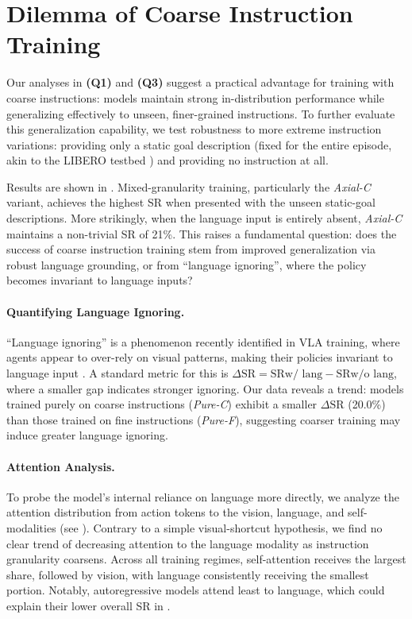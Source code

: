 \documentclass{article}
\begin{document}
\section{Dilemma of Coarse Instruction Training}
\label{sec:more_analysis_on_coarse_instruction_training}

Our analyses in \textbf{(Q1)} and \textbf{(Q3)} suggest a practical advantage for training with coarse instructions: models maintain strong in-distribution performance while generalizing effectively to unseen, finer-grained instructions. To further evaluate this generalization capability, we test robustness to more extreme instruction variations: providing only a static goal description (fixed for the entire episode, akin to the \textsc{LIBERO} testbed \cite{DBLP:conf/nips/LiuZGFLZS23}) and providing no instruction at all.

Results are shown in . Mixed-granularity training, particularly the \emph{Axial-C} variant, achieves the highest SR when presented with the unseen static-goal descriptions. More strikingly, when the language input is entirely absent, \emph{Axial-C} maintains a non-trivial SR of 21\%. This raises a fundamental question: does the success of coarse instruction training stem from improved generalization via robust language grounding, or from ``language ignoring'', where the policy becomes invariant to language inputs?

\paragraph{Quantifying Language Ignoring.}
``Language ignoring'' is a phenomenon recently identified in VLA training, where agents appear to over-rely on visual patterns, making their policies invariant to language input \cite{xing2025shortcut,fei2025liberoplus}. A standard metric for this is $\Delta\mathrm{SR} = \mathrm{SR}{\text{w/ lang}} - \mathrm{SR}{\text{w/o lang}}$, where a smaller gap indicates stronger ignoring. Our data reveals a trend: models trained purely on coarse instructions (\emph{Pure-C}) exhibit a smaller $\Delta\mathrm{SR}$ (20.0\%) than those trained on fine instructions (\emph{Pure-F}), suggesting coarser training may induce greater language ignoring. 

\paragraph{Attention Analysis.}
To probe the model's internal reliance on language more directly, we analyze the attention distribution from action tokens to the vision, language, and self-modalities (see ). Contrary to a simple visual-shortcut hypothesis, we find no clear trend of decreasing attention to the language modality as instruction granularity coarsens. Across all training regimes, self-attention receives the largest share, followed by vision, with language consistently receiving the smallest portion. Notably, autoregressive models attend least to language, which could explain their lower overall SR in . 
\end{document}
